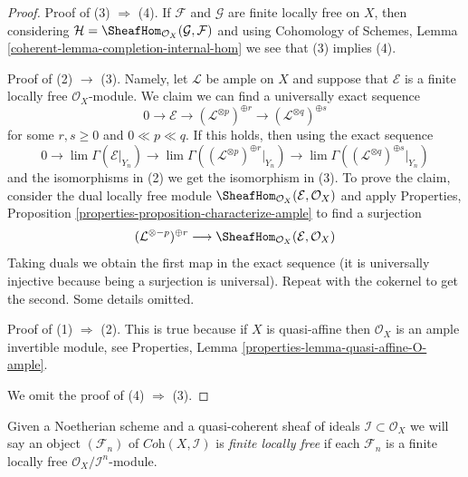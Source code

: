 \begin{proof}
Proof of (3) $\Rightarrow$ (4). If $\mathcal{F}$ and $\mathcal{G}$
are finite locally free on $X$, then considering
$\mathcal{H} = \SheafHom_{\mathcal{O}_X}(\mathcal{G}, \mathcal{F})$
and using Cohomology of Schemes, Lemma
\ref{coherent-lemma-completion-internal-hom}
we see that (3) implies (4).

\medskip\noindent
Proof of (2) $\rightarrow$ (3). Namely, let $\mathcal{L}$ be ample
on $X$ and suppose that $\mathcal{E}$ is a
finite locally free $\mathcal{O}_X$-module.
We claim we can find a universally exact sequence
$$
0 \to \mathcal{E} \to
(\mathcal{L}^{\otimes p})^{\oplus r} \to
(\mathcal{L}^{\otimes q})^{\oplus s}
$$
for some $r, s \geq 0$ and $0 \ll p \ll q$. If this holds, then
using the exact sequence
$$
0 \to \lim \Gamma(\mathcal{E}|_{Y_n}) \to
\lim \Gamma((\mathcal{L}^{\otimes p})^{\oplus r}|_{Y_n}) \to
\lim \Gamma((\mathcal{L}^{\otimes q})^{\oplus s}|_{Y_n})
$$
and the isomorphisms in (2) we get the isomorphism in (3).
To prove the claim, consider the dual locally free module
$\SheafHom_{\mathcal{O}_X}(\mathcal{E}, \mathcal{O}_X)$
and apply
Properties, Proposition \ref{properties-proposition-characterize-ample}
to find a surjection
$$
(\mathcal{L}^{\otimes -p})^{\oplus r}
\longrightarrow
\SheafHom_{\mathcal{O}_X}(\mathcal{E}, \mathcal{O}_X)
$$
Taking duals we obtain the first map in the exact sequence
(it is universally injective because being a surjection is universal).
Repeat with the cokernel to get the second. Some details omitted.

\medskip\noindent
Proof of (1) $\Rightarrow$ (2). This is true because if $X$ is quasi-affine
then $\mathcal{O}_X$ is an ample invertible module, see
Properties, Lemma \ref{properties-lemma-quasi-affine-O-ample}.

\medskip\noindent
We omit the proof of (4) $\Rightarrow$ (3).
\end{proof}

Given a Noetherian scheme and a quasi-coherent sheaf of ideals
$\mathcal{I} \subset \mathcal{O}_X$ we will say
an object $(\mathcal{F}_n)$ of $\textit{Coh}(X, \mathcal{I})$
is {\it finite locally free} if each $\mathcal{F}_n$ is a finite
locally free $\mathcal{O}_X/\mathcal{I}^n$-module.

